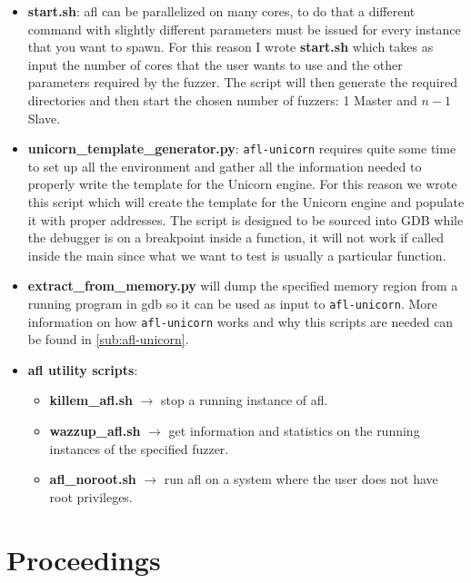 \documentclass[../main.tex]{subfiles}
\begin{document}
\begin{itemize}

  \item \textbf{start.sh}: afl can be parallelized on many cores, to do that a
  different command with slightly different parameters must be issued for every
  instance that you want to spawn. For this reason I wrote \textbf{start.sh}
  which takes as input the number of cores that the  user wants to use and the
  other parameters required by the fuzzer. The script  will then generate the
  required directories and then start the chosen number  of fuzzers: 1 Master
  and $n-1$ Slave.

  \item \textbf{unicorn\_template\_generator.py}: \texttt{afl-unicorn} requires
  quite  some time to set up all the environment and gather all the information
  needed  to properly write the template for the Unicorn engine. For this reason
  we  wrote this script which will create the template for the Unicorn engine
  and  populate it with proper addresses. The script is designed to be sourced
  into  GDB while the debugger is on a breakpoint inside a function, it will not
  work  if called inside the main since what we want to test is usually a
  particular  function.

  \item \textbf{extract\_from\_memory.py} will dump the specified memory region from a running program in gdb so it can be used as input to \texttt{afl-unicorn}.  More information on how
  \texttt{afl-unicorn} works and why this scripts are needed can be found in \ref{sub:afl-unicorn}. %

  \item \textbf{afl utility scripts}:

  \begin{itemize}

    \item \textbf{killem\_afl.sh} $\rightarrow$ stop a running instance of afl.

    \item \textbf{wazzup\_afl.sh} $\rightarrow$  get information and statistics on the running instances of the specified fuzzer.

    \item \textbf{afl\_noroot.sh} $\rightarrow$ run afl on a system where the user does not have root privileges.

  \end{itemize}

\end{itemize}



\section{Proceedings}

\end{document}
